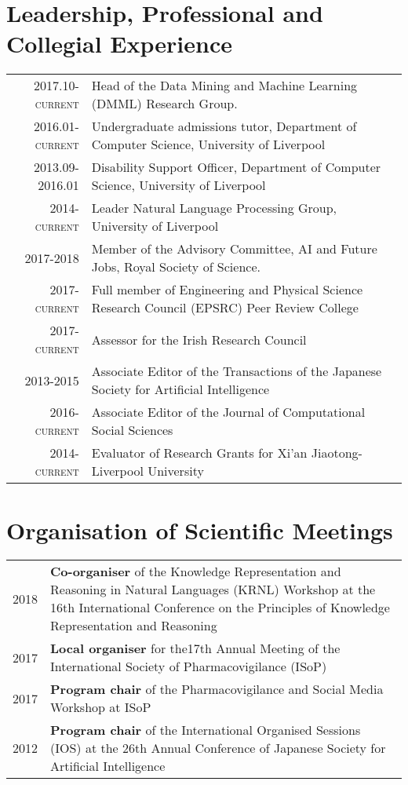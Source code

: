 \documentclass[a4paper,11pt]{article}
\begin{document}
\section{Leadership, Professional and Collegial Experience}
\begin{tabular}{r p{11cm}}
\textsc{2017.10-current} & Head of the Data Mining and Machine Learning (DMML) Research Group.\\
\textsc{2016.01-current} & Undergraduate admissions tutor, Department of Computer Science, University of Liverpool \\
\textsc{2013.09-2016.01} & Disability Support Officer, Department of Computer Science, University of Liverpool \\
\textsc{2014-current} & Leader Natural Language Processing Group, University of Liverpool\\
\textsc{2017-2018} & Member of the Advisory Committee, AI and Future Jobs, Royal Society of Science.\\
\textsc{2017-current} & Full member of Engineering and  Physical Science Research Council (EPSRC) Peer Review College \\
\textsc{2017-current} & Assessor for the Irish Research Council \\
\textsc{2013-2015} & Associate Editor of the Transactions of the Japanese Society for Artificial Intelligence\\
\textsc{2016-current} & Associate Editor of the Journal of Computational Social Sciences\\
\textsc{2014-current} & Evaluator of Research Grants for Xi'an Jiaotong-Liverpool University
\end{tabular}

\section{Organisation of Scientific Meetings}
\begin{tabular}{r p{13cm}}
\textsc{2018} & \textbf{Co-organiser} of the Knowledge Representation and Reasoning in Natural Languages (KRNL) Workshop at the 16th International Conference on the Principles of Knowledge Representation and Reasoning\\
\textsc{2017} & \textbf{Local organiser} for the17th Annual Meeting of the International Society of Pharmacovigilance (ISoP)\\
\textsc{2017} & \textbf{Program chair} of the Pharmacovigilance and Social Media Workshop at ISoP\\
\textsc{2012} & \textbf{Program chair} of the International Organised Sessions (IOS) at the 26th Annual Conference of Japanese Society for Artificial Intelligence
\end{tabular}
\end{document}
